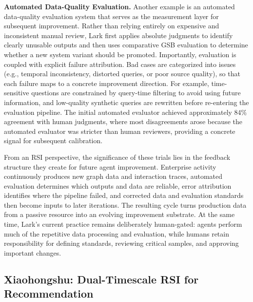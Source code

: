 \textbf{Automated Data-Quality Evaluation.} Another example is an automated data-quality evaluation system that serves as the measurement layer for subsequent improvement. Rather than relying entirely on expensive and inconsistent manual review, Lark first applies absolute judgments to identify clearly unusable outputs and then uses comparative GSB evaluation to determine whether a new system variant should be promoted. Importantly, evaluation is coupled with explicit failure attribution. Bad cases are categorized into issues (e.g., temporal inconsistency, distorted queries, or poor source quality), so that each failure maps to a concrete improvement direction. For example, time-sensitive questions are constrained by query-time filtering to avoid using future information, and low-quality synthetic queries are rewritten before re-entering the evaluation pipeline. The initial automated evaluator achieved approximately 84\% agreement with human judgments, where most disagreements arose because the automated evaluator was stricter than human reviewers, providing a concrete signal for subsequent calibration.

From an RSI perspective, the significance of these trials lies in the feedback structure they create for future agent improvement. Enterprise activity continuously produces new graph data and interaction traces, automated evaluation determines which outputs and data are reliable, error attribution identifies where the pipeline failed, and corrected data and evaluation standards then become inputs to later iterations. The resulting cycle turns production data from a passive resource into an evolving improvement substrate. At the same time, Lark's current practice remains deliberately human-gated: agents perform much of the repetitive data processing and evaluation, while humans retain responsibility for defining standards, reviewing critical samples, and approving important changes.


\subsection{Xiaohongshu: Dual-Timescale RSI for Recommendation}


